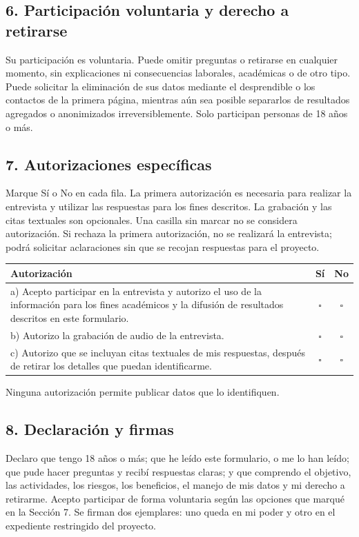 \subsection*{6. Participaci\'on voluntaria y derecho a retirarse}
Su participaci\'on es voluntaria. Puede omitir preguntas o retirarse en cualquier momento, sin
explicaciones ni consecuencias laborales, acad\'emicas o de otro tipo. Puede solicitar la
eliminaci\'on de sus datos mediante el desprendible o los contactos de la primera p\'agina,
mientras a\'un sea posible separarlos de resultados agregados o anonimizados irreversiblemente.
Solo participan personas de 18 a\~nos o m\'as.

\subsection*{7. Autorizaciones espec\'ificas}
Marque S\'i o No en cada fila. La primera autorizaci\'on es necesaria para realizar la entrevista y
utilizar las respuestas para los fines descritos. La grabaci\'on y las citas textuales son
opcionales. Una casilla sin marcar no se considera autorizaci\'on. Si rechaza la primera
autorizaci\'on, no se realizar\'a la entrevista; podr\'a solicitar aclaraciones sin que se recojan
respuestas para el proyecto.

\noindent\begin{tabularx}{\linewidth}{@{}Ycc@{}}
  \toprule
  \textbf{Autorizaci\'on} & \textbf{S\'i} & \textbf{No} \\
  \midrule
  a) Acepto participar en la entrevista y autorizo el uso de la informaci\'on para los fines
     acad\'emicos y la difusi\'on de resultados descritos en este formulario. & $\square$ & $\square$ \\
  b) Autorizo la grabaci\'on de audio de la entrevista. & $\square$ & $\square$ \\
  c) Autorizo que se incluyan citas textuales de mis respuestas, despu\'es de retirar los
     detalles que puedan identificarme. & $\square$ & $\square$ \\
  \bottomrule
\end{tabularx}

\smallskip
Ninguna autorizaci\'on permite publicar datos que lo identifiquen.

\subsection*{8. Declaraci\'on y firmas}
Declaro que tengo 18 a\~nos o m\'as; que he le\'ido este formulario, o me lo han le\'ido; que pude
hacer preguntas y recib\'i respuestas claras; y que comprendo el objetivo, las actividades, los
riesgos, los beneficios, el manejo de mis datos y mi derecho a retirarme. Acepto participar de
forma voluntaria seg\'un las opciones que marqu\'e en la Secci\'on 7. Se firman dos ejemplares: uno
queda en mi poder y otro en el expediente restringido del proyecto.

